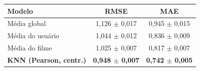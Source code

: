\begin{tabular}{lcc}
\hline
Modelo & RMSE & MAE \\
\hline
M\'edia global & 1,126 $\pm$ 0,017 & 0,945 $\pm$ 0,015 \\
M\'edia do usu\'ario & 1,044 $\pm$ 0,012 & 0,836 $\pm$ 0,009 \\
M\'edia do filme & 1,025 $\pm$ 0,007 & 0,817 $\pm$ 0,007 \\
\textbf{KNN (Pearson, centr.)} & \textbf{0,948 $\pm$ 0,007} & \textbf{0,742 $\pm$ 0,005} \\
\hline
\end{tabular}
